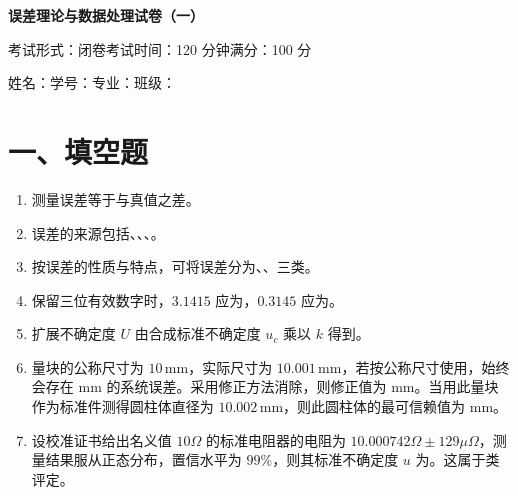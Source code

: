 \documentclass[UTF8,12pt,a4paper]{ctexart}
\newcommand{\blank}[1][2.4cm]{\underline{\hspace{#1}}}
\begin{document}
\begin{center}
    {\bfseries 误差理论与数据处理试卷（一）}\par
    \vspace{0.8em}
    考试形式：闭卷\quad 考试时间：120 分钟\quad 满分：100 分
\end{center}
\vspace{0.3em}
\noindent 姓名：\blank[2cm]\quad 学号：\blank[2.5cm]\quad 专业：\blank[2.5cm]\quad 班级：\blank[2cm]
\vspace{0.6em}

\section*{一、填空题}
\begin{enumerate}[label=\arabic*、]
\item 测量误差等于\blank 与真值之差。
\item 误差的来源包括\blank[2cm]、\blank[2cm]、\blank[2cm]、\blank[2cm]。
\item 按误差的性质与特点，可将误差分为\blank[2cm]、\blank[2cm]、\blank[2cm]三类。
\item 保留三位有效数字时，$3.1415$ 应为\blank[1.5cm]，$0.3145$ 应为\blank[1.5cm]。
\item 扩展不确定度 $U$ 由合成标准不确定度 $u_c$ 乘以\blank[2cm] $k$ 得到。
\item 量块的公称尺寸为 $10\,\mathrm{mm}$，实际尺寸为 $10.001\,\mathrm{mm}$，若按公称尺寸使用，始终会存在\blank[1.6cm] $\mathrm{mm}$ 的系统误差。采用修正方法消除，则修正值为\blank[1.6cm] $\mathrm{mm}$。当用此量块作为标准件测得圆柱体直径为 $10.002\,\mathrm{mm}$，则此圆柱体的最可信赖值为\blank[1.8cm] $\mathrm{mm}$。
\item 设校准证书给出名义值 $10\Omega$ 的标准电阻器的电阻为 $10.000742\Omega\pm129\mu\Omega$，测量结果服从正态分布，置信水平为 $99\%$，则其标准不确定度 $u$ 为\blank[2cm]。这属于\blank[1cm]类评定。
\end{enumerate}
\end{document}
